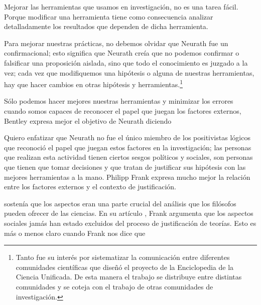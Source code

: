 Mejorar las herramientas que usamos en investigación, no es una tarea fácil. 
Porque modificar una herramienta tiene como consecuencia analizar detalladamente los resultados que dependen de dicha herramienta.

Para mejorar nuestras prácticas, no debemos olvidar que Neurath fue un  confirmacional; esto significa que Neurath creía que no podemos confirmar o falsificar una proposición aislada, sino que todo el conocimiento es juzgado a la vez; 
cada vez que modifiquemos una hipótesis o alguna de nuestras herramientas, hay que hacer cambios en otras hipótesis y herramientas.\footnote{
	Tanto fue su interés por sistematizar la comunicación entre diferentes comunidades científicas que diseñó el proyecto de la Enciclopedia de la  Ciencia Unificada.
	De esta manera el trabajo se distribuye entre distintas comunidades y se coteja con el trabajo de otras comunidades de investigación.
	}

Sólo podemos hacer mejores nuestras herramientas y minimizar los errores cuando somos capaces de reconocer el papel que juegan los factores externos, Bentley expresa mejor el objetivo de Neurath diciendo  \parencite[p. 41]{Bentley2023}

Quiero enfatizar que Neurath no fue el único miembro de los positivistas lógicos que reconoció el papel que juegan estos factores en la investigación; 
las personas que realizan esta actividad tienen ciertos sesgos políticos y sociales, son personas que tienen que tomar decisiones y que tratan de justificar sus hipótesis con las mejores herramientas a la mano.
Philipp Frank expresa mucho mejor la relación entre los factores externos y el contexto de justificación.



 sostenía que los aspectos  eran una parte crucial del análisis que los filósofos pueden ofrecer de las ciencias.
En su artículo , Frank argumenta que los aspectos sociales jamás han estado excluidos del proceso de justificación de teorías.
Esto es más o menos claro cuando Frank nos dice que  \parencite[p. 143]{Frank1954}

